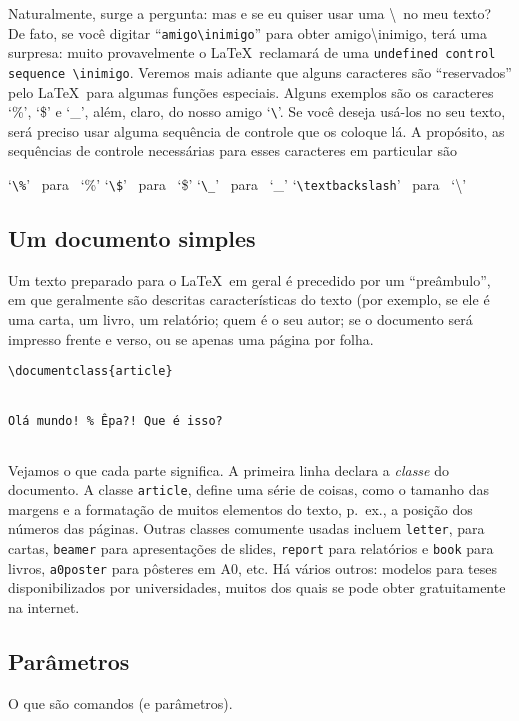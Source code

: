 Naturalmente, surge a pergunta: mas e se eu quiser usar uma
\textbackslash\ no meu texto? De fato, se você digitar
``\verb|amigo\inimigo|'' para obter amigo\textbackslash inimigo, terá
uma surpresa: muito provavelmente o \LaTeX\ reclamará de uma
\verb!undefined control sequence \inimigo!. Veremos mais adiante que
alguns caracteres são ``reservados'' pelo \LaTeX\ para algumas funções
especiais. Alguns exemplos são os caracteres `\%', `\$' e `\_', além,
claro, do nosso amigo `\verb|\|'. Se você deseja usá-los no seu texto,
será preciso usar alguma sequência de controle que os coloque lá. A
propósito, as sequências de controle necessárias para esses caracteres
em particular são

\begin{center}
  `\verb|\%|' \ para \ `\%'%
  \qquad`\verb|\$|' \ para  \ `\$'%
  \qquad`\verb|\_|\negthinspace' \ para \ `\_'%
  \qquad`\verb|\textbackslash|' \ para \ `\textbackslash'\qquad
\end{center}

\subsection{Um documento simples}

Um texto preparado para o \LaTeX\ em geral é precedido por um
``preâmbulo'', em que geralmente são descritas características do
texto (por exemplo, se ele é uma carta, um livro, um relatório; quem é
o seu autor; se o documento será impresso frente e verso, ou se apenas
uma página por folha.

\begin{verbatim}
\documentclass{article}


Olá mundo! % Êpa?! Que é isso?


\end{verbatim}

Vejamos o que cada parte significa. A primeira linha declara a
\emph{classe} do documento. A classe \verb!article!, define uma série
de coisas, como o tamanho das margens e a formatação de muitos
elementos do texto, p.~ex., a posição dos números das páginas. Outras
classes comumente usadas incluem \verb!letter!, para cartas,
\verb!beamer! para apresentações de slides, \verb!report! para
relatórios e \verb!book! para livros, \verb!a0poster! para pôsteres em
A0, etc. Há vários outros: modelos para teses disponibilizados por
universidades, muitos dos quais se pode obter gratuitamente na internet.


\subsection{Parâmetros}
O que são comandos (e parâmetros).

